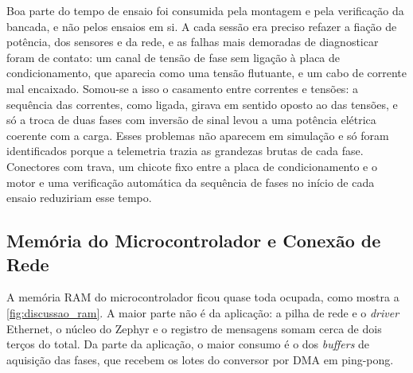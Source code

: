 Boa parte do tempo de ensaio foi consumida pela montagem e pela verificação
da bancada, e não pelos ensaios em si. A cada sessão era preciso refazer a
fiação de potência, dos sensores e da rede, e as falhas mais demoradas de
diagnosticar foram de contato: um canal de tensão de fase sem ligação à placa
de condicionamento, que aparecia como uma tensão flutuante, e um cabo de
corrente mal encaixado. Somou-se a isso o casamento entre correntes e tensões:
a sequência das correntes, como ligada, girava em sentido oposto ao das
tensões, e só a troca de duas fases com inversão de sinal levou a uma
potência elétrica coerente com a carga. Esses problemas não aparecem em
simulação e só foram identificados porque a telemetria trazia as grandezas
brutas de cada fase. Conectores com trava, um chicote fixo entre a placa de
condicionamento e o motor e uma verificação automática da sequência de fases
no início de cada ensaio reduziriam esse tempo.

\subsection{Memória do Microcontrolador e Conexão de Rede}
\label{sec:discussao_memoria}

A memória RAM do microcontrolador ficou quase toda ocupada, como mostra a
\autoref{fig:discussao_ram}. A maior parte não é da aplicação: a pilha de rede
e o \textit{driver} Ethernet, o núcleo do Zephyr e o registro de mensagens
somam cerca de dois terços do total. Da parte da aplicação, o maior consumo é
o dos \textit{buffers} de aquisição das fases, que recebem os lotes do
conversor por DMA em ping-pong.

